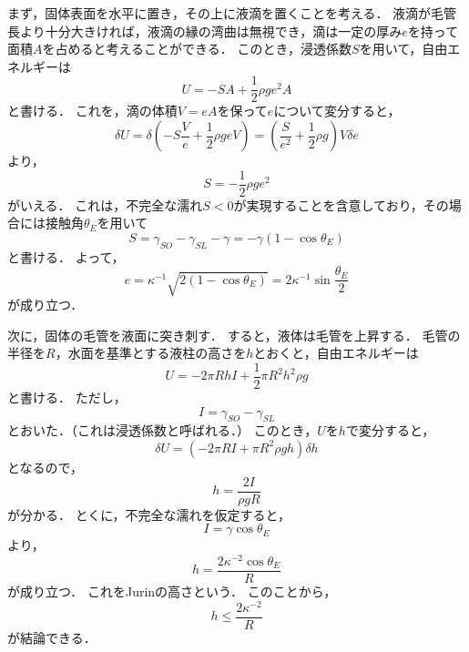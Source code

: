 \documentclass[a4paper,11pt]{jsarticle}
\begin{document}
まず，固体表面を水平に置き，その上に液滴を置くことを考える．
液滴が毛管長より十分大きければ，液滴の縁の湾曲は無視でき，滴は一定の厚み$e$を持って面積$A$を占めると考えることができる．
このとき，浸透係数$S$を用いて，自由エネルギーは
\begin{equation}
  U = - SA + \frac{1}{2} \rho g e^2 A
\end{equation}
と書ける．
これを，滴の体積$V=eA$を保って$e$について変分すると，
\begin{equation}
  \delta U = \delta \left(- S\frac{V}{e} + \frac{1}{2} \rho g e V \right)= \left( \frac{S}{e^2} + \frac{1}{2} \rho g  \right)V\delta e
\end{equation}
より，
\begin{equation}
  S = -\frac{1}{2}\rho g e^2
\end{equation}
がいえる．
これは，不完全な濡れ$S<0$が実現することを含意しており，その場合には接触角$\theta_E$を用いて
\begin{equation}
  S = \gamma_{SO} - \gamma_{SL} - \gamma = -\gamma\left(1-\cos{\theta_E}\right)
\end{equation}
と書ける．
よって，
\begin{equation}
  e = \kappa^{-1}\sqrt{2(1-\cos{\theta_E})} = 2\kappa^{-1}\sin{\frac{\theta_E}{2}}
\end{equation}
が成り立つ．

次に，固体の毛管を液面に突き刺す．
すると，液体は毛管を上昇する．
毛管の半径を$R$，水面を基準とする液柱の高さを$h$とおくと，自由エネルギーは
\begin{equation}
  U = -2\pi R hI + \frac{1}{2}\pi R^2 h^2 \rho g
\end{equation}
と書ける．
ただし，
\begin{equation}
  I = \gamma_{SO} - \gamma_{SL}
\end{equation}
とおいた．（これは浸透係数と呼ばれる．）
このとき，$U$を$h$で変分すると，
\begin{equation}
  \delta U = \left(-2\pi R I + \pi R^2 \rho g h\right)\delta h
\end{equation}
となるので，
\begin{equation}
  h = \frac{2I}{\rho g R}
\end{equation}
が分かる．
とくに，不完全な濡れを仮定すると，
\begin{equation}
  I = \gamma \cos{\theta_E}
\end{equation}
より，
\begin{equation}
  h = \frac{2\kappa^{-2}\cos{\theta_E}}{R}
\end{equation}
が成り立つ．
これをJurinの高さという．
このことから，
\begin{equation}
  h \le \frac{2\kappa^{-2}}{R}
\end{equation}
が結論できる．
\end{document}
